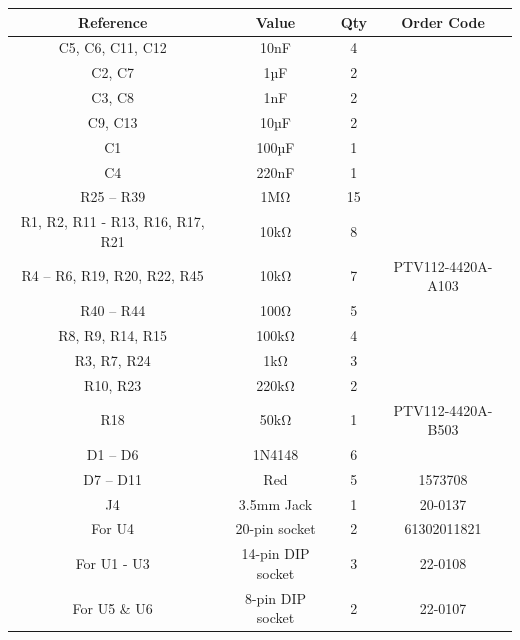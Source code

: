 \def\arraystretch{2}
\begin{tabular}{cccc}
\hline
\textbf{Reference}               & \textbf{Value}    & \textbf{Qty} & \textbf{Order Code} \\ \hline
C5, C6, C11, C12                 & 10nF              & 4            &                     \\ \hline
C2, C7                           & 1µF               & 2            &                     \\ \hline
C3, C8                           & 1nF               & 2            &                     \\ \hline
C9, C13                          & 10µF              & 2            &                     \\ \hline
C1                               & 100µF             & 1            &                     \\ \hline
C4                               & 220nF             & 1            &                     \\ \hline
R25 – R39                        & 1MΩ               & 15           &                     \\ \hline
R1, R2, R11 - R13, R16, R17, R21 & 10kΩ              & 8            &                     \\ \hline
R4 – R6, R19, R20, R22, R45      & 10kΩ              & 7            & PTV112-4420A-A103   \\ \hline
R40 – R44                        & 100Ω              & 5            &                     \\ \hline
R8, R9, R14, R15                 & 100kΩ             & 4            &                     \\ \hline
R3, R7, R24                      & 1kΩ               & 3            &                     \\ \hline
R10, R23                         & 220kΩ             & 2            &                     \\ \hline
R18                              & 50kΩ              & 1            & PTV112-4420A-B503   \\ \hline
D1 – D6                          & 1N4148            & 6            &                     \\ \hline
D7 – D11                         & Red               & 5            & 1573708             \\ \hline
J4                               & 3.5mm Jack        & 1            & 20-0137             \\ \hline
For U4                           & 20-pin socket     & 2            & 61302011821         \\ \hline
For U1 - U3                      & 14-pin DIP socket & 3            & 22-0108             \\ \hline
For U5 \& U6                     & 8-pin DIP socket  & 2            & 22-0107             \\ \hline
\end{tabular}




